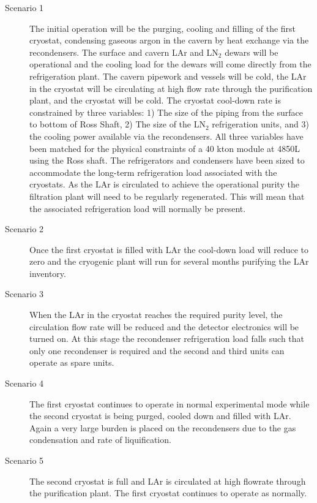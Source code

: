 \begin{description}
\item[Scenario 1]
The initial operation will be the purging, cooling and filling of the 
first cryostat, condensing gaseous argon in the cavern by heat exchange 
via the recondensers. The surface and cavern LAr and  LN$_2$ dewars 
will be operational and the cooling load for the dewars will come 
directly from the refrigeration plant. The cavern pipework and vessels 
will be cold, the LAr in the cryostat will be circulating at high flow 
rate through the purification plant, and the cryostat will be cold.
The cryostat cool-down rate is constrained by three variables: 1) The 
size of the piping from the surface to bottom of Ross Shaft, 2) The 
size of the LN$_2$ refrigeration units, and 3) the cooling power 
available via the recondensers.  All three variables have been 
matched for the physical constraints of a 40 kton module at 4850L 
using the Ross shaft. The refrigerators and condensers have been 
sized to accommodate the long-term refrigeration load associated 
with the cryostats.  As the LAr is circulated to achieve the 
operational purity the filtration plant will need to be regularly 
regenerated. This will mean that the associated refrigeration 
load will normally be present.

\item[Scenario 2]
Once the first cryostat is filled with LAr the cool-down load will 
reduce to zero and the cryogenic plant will run for several months 
purifying the LAr inventory.

\item[Scenario 3]
When the LAr in the cryostat reaches the required purity level, the 
circulation flow rate will be reduced and the detector electronics 
will be turned on.  At this stage the recondenser refrigeration 
load falls such that only one recondenser is required and the 
second and third units can operate as spare units.

\item[Scenario 4] The first cryostat continues to operate in normal
experimental mode 
while  the second cryostat is being purged, cooled down and 
filled with LAr. Again a very large burden is placed on the 
recondensers due to the gas condensation and rate of liquification.

\item[Scenario 5] The second cryostat is full and LAr is circulated 
at high flowrate through the purification plant. The first cryostat
continues to operate as normally.


\end{description}
